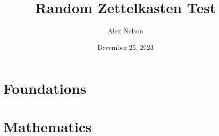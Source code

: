 \documentclass[dvipsnames,HTML]{amsbook}
\title{Random Zettelkasten Test}
\author{Alex Nelson}
\date{December 25, 2023}
\begin{document}
\frontmatter
\maketitle
\tableofcontents
\listofpuzzles

\mainmatter
\vfill\eject

\part{Foundations}












\part{Mathematics}





\backmatter
\appendix


\unappendix
\nocite{*}

\end{document}

